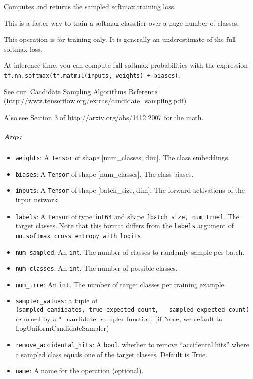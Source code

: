 Computes and returns the sampled softmax training loss.

This is a faster way to train a softmax classifier over a huge number of
classes.

This operation is for training only. It is generally an underestimate of
the full softmax loss.

At inference time, you can compute full softmax probabilities with the
expression
\texttt{tf.nn.softmax(tf.matmul(inputs,\ weights)\ +\ biases)}.

See our {[}Candidate Sampling Algorithms Reference{]}
(http://www.tensorflow.org/extras/candidate\_sampling.pdf)

Also see Section 3 of http://arxiv.org/abs/1412.2007 for the math.

\subparagraph{Args: }\label{args-24}

\begin{itemize}
\tightlist
\item
  \texttt{weights}: A \texttt{Tensor} of shape {[}num\_classes, dim{]}.
  The class embeddings.
\item
  \texttt{biases}: A \texttt{Tensor} of shape {[}num\_classes{]}. The
  class biases.
\item
  \texttt{inputs}: A \texttt{Tensor} of shape {[}batch\_size, dim{]}.
  The forward activations of the input network.
\item
  \texttt{labels}: A \texttt{Tensor} of type \texttt{int64} and shape
  \texttt{{[}batch\_size,\ num\_true{]}}. The target classes. Note that
  this format differs from the \texttt{labels} argument of
  \texttt{nn.softmax\_cross\_entropy\_with\_logits}.
\item
  \texttt{num\_sampled}: An \texttt{int}. The number of classes to
  randomly sample per batch.
\item
  \texttt{num\_classes}: An \texttt{int}. The number of possible
  classes.
\item
  \texttt{num\_true}: An \texttt{int}. The number of target classes per
  training example.
\item
  \texttt{sampled\_values}: a tuple of
  \texttt{(sampled\_candidates,\ true\_expected\_count,\ \ \ sampled\_expected\_count)}
  returned by a *\_candidate\_sampler function. (if None, we default to
  LogUniformCandidateSampler)
\item
  \texttt{remove\_accidental\_hits}: A \texttt{bool}. whether to remove
  ``accidental hits'' where a sampled class equals one of the target
  classes. Default is True.
\item
  \texttt{name}: A name for the operation (optional).
\end{itemize}

